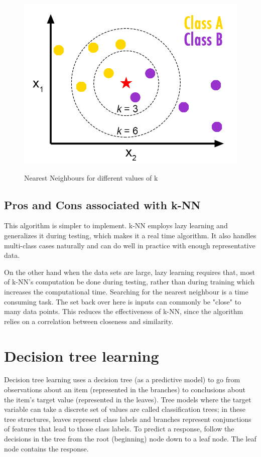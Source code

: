 \begin{figure}[H]
\centering
{\includegraphics[scale=0.60]{knn.png}}
\caption{Nearest Neighbours for different values of k}
\end{figure}


\subsection{Pros and Cons associated with k-NN} \label{Pros and Cons associated with k-NN}
\noindent This algorithm is simpler to implement. k-NN employs lazy learning and generalizes it during testing, which makes it a real time algorithm. It also handles multi-class cases naturally and can do well in practice with enough representative data. 

\noindent On the other hand when the data sets are large, lazy learning requires that, most of k-NN's computation be done during testing, rather than during training which increases the computational time. Searching for the nearest neighbour is a time consuming task. The set back over here is inputs can commonly be "close" to many data points. This reduces the effectiveness of k-NN, since the algorithm relies on a correlation between closeness and similarity.

\newpage

\section{Decision tree learning} \label{Decision tree learning}

\noindent Decision tree learning uses a decision tree (as a predictive model) to go from observations about an item (represented in the branches) to conclusions about the item's target value (represented in the leaves). Tree models where the target variable can take a discrete set of values are called classification trees; in these tree structures, leaves represent class labels and branches represent conjunctions of features that lead to those class labels. To predict a response, follow the decisions in the tree from the root (beginning) node down to a leaf node. The leaf node contains the response.



